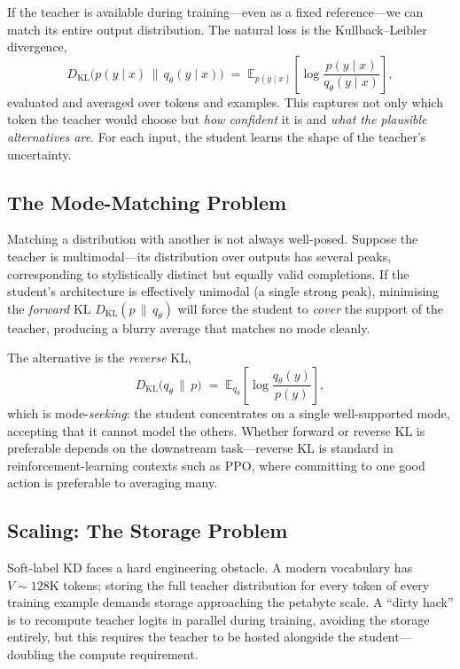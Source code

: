\documentclass[11pt,a4paper]{article}
\theoremstyle{definition}
\theoremstyle{remark}
\theoremstyle{plain}
\newcommand{\E}{\mathbb{E}}
\newcommand{\KL}{D_{\mathrm{KL}}}
\begin{document}
If the teacher is available during training---even as a fixed
reference---we can match its entire output distribution. The natural loss
is the Kullback--Leibler divergence,
\begin{equation}
  \KL\bigl(p(y\mid x) \,\|\, q_\theta(y\mid x)\bigr) \;=\; \E_{p(y\mid x)}\!\left[\log \frac{p(y\mid x)}{q_\theta(y\mid x)}\right],
  \label{eq:kl}
\end{equation}
evaluated and averaged over tokens and examples. This captures not only
which token the teacher would choose but \emph{how confident} it is and
\emph{what the plausible alternatives are}. For each input, the student
learns the shape of the teacher's uncertainty.

\subsection{The Mode-Matching Problem}

Matching a distribution with another is not always well-posed. Suppose the
teacher is multimodal---its distribution over outputs has several peaks,
corresponding to stylistically distinct but equally valid completions. If
the student's architecture is effectively unimodal (a single strong peak),
minimising the \emph{forward} KL $\KL(p \,\|\, q_\theta)$ will force the
student to \emph{cover} the support of the teacher, producing a blurry
average that matches no mode cleanly.

The alternative is the \emph{reverse} KL,
\begin{equation}
  \KL\bigl(q_\theta \,\|\, p\bigr) \;=\; \E_{q_\theta}\!\left[\log \frac{q_\theta(y)}{p(y)}\right],
\end{equation}
which is mode-\emph{seeking}: the student concentrates on a single
well-supported mode, accepting that it cannot model the others. Whether
forward or reverse KL is preferable depends on the downstream task---reverse
KL is standard in reinforcement-learning contexts such as PPO, where
committing to one good action is preferable to averaging many.

\subsection{Scaling: The Storage Problem}

Soft-label KD faces a hard engineering obstacle. A modern vocabulary has
$V \sim 128\text{K}$ tokens; storing the full teacher distribution for
every token of every training example demands storage approaching the
petabyte scale. A ``dirty hack'' is to recompute teacher logits in
parallel during training, avoiding the storage entirely, but this requires
the teacher to be hosted alongside the student---doubling the compute
requirement.
\end{document}
